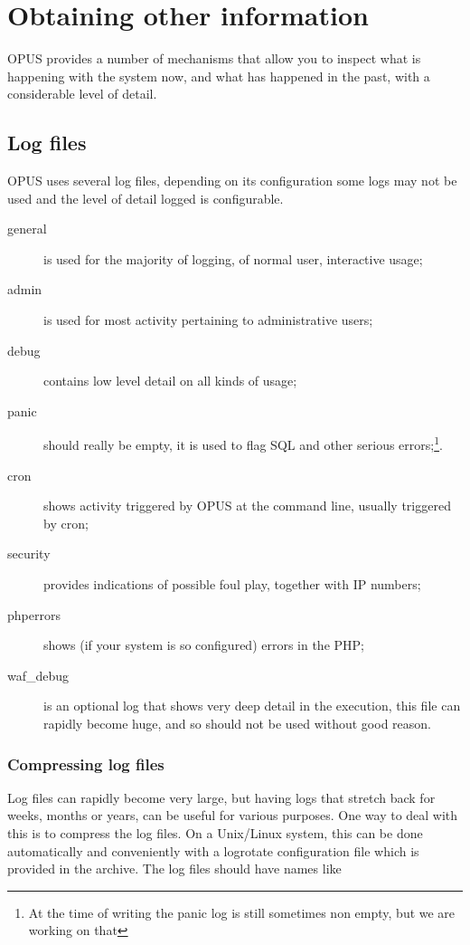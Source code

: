 \documentclass[12 pt]{book}
\begin{document}
\chapter{Obtaining other information}

OPUS provides a number of mechanisms that allow you to inspect what is happening with the
system now, and what has happened in the past, with a considerable level of detail.

\section{Log files}

OPUS uses several log files, depending on its configuration some logs may not be used and
the level of detail logged is configurable.

\begin{description}
  \item[general] is used for the majority of logging, of normal user, interactive usage;
  \item[admin] is used for most activity pertaining to administrative users;
  \item[debug] contains low level detail on all kinds of usage;
  \item[panic] should really be empty, it is used to flag SQL and other serious errors;\footnote{At the time of writing the panic log is still sometimes non empty, but we are working on that}.
  \item[cron] shows activity triggered by OPUS at the command line, usually triggered by cron;
  \item[security] provides indications of possible foul play, together with IP numbers;
  \item[phperrors] shows (if your system is so configured) errors in the PHP;
  \item[waf\_debug] is an optional log that shows very deep detail in the execution, this file can rapidly become huge, and so should not be used without good reason.
\end{description}

\subsection{Compressing log files}

Log files can rapidly become very large, but having logs that stretch back for weeks, months or years, can
be useful for various purposes. One way to deal with this is to compress the log files. On a Unix/Linux
system, this can be done automatically and conveniently with a logrotate configuration file which is
provided in the archive. The log files should have names like
\end{document}
